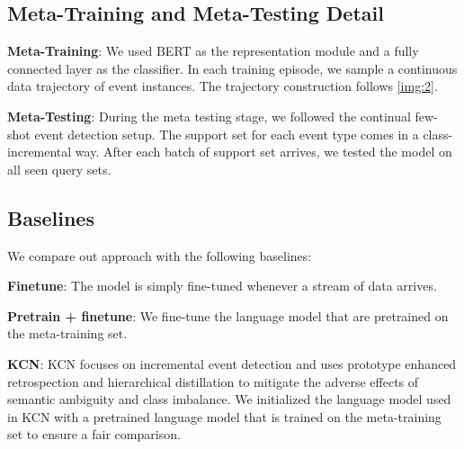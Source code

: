 \subsection{Meta-Training and Meta-Testing Detail}
\textbf{Meta-Training}: We used BERT \citep{devlin2018bert} as the representation module and a fully connected layer as the classifier.  In each training episode, we sample a continuous data trajectory of event instances.  The trajectory construction follows \ref{img:2}. 

\noindent
\textbf{Meta-Testing}: During the meta testing stage,  we followed the continual few-shot event detection setup. The support set for each event type comes in a class-incremental way. After each batch of support set arrives, we tested the model on all seen query sets. 

\subsection{Baselines}
We compare out approach with the following baselines: 

\noindent
\textbf{Finetune}: The model is simply fine-tuned whenever a stream of data arrives.

\noindent
\textbf{Pretrain + finetune}: We fine-tune the language model that are pretrained on the meta-training set. 

\noindent
\textbf{KCN}\citep{cao2020incremental}: KCN focuses on incremental event detection and uses prototype enhanced retrospection and hierarchical distillation to mitigate the adverse effects of semantic ambiguity and class imbalance. We initialized the language model used in KCN with a pretrained language model that is trained on the meta-training set to ensure a fair comparison. 

